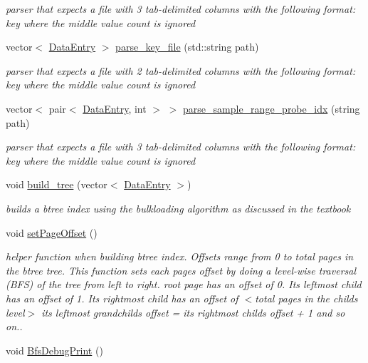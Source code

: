 \begin{DoxyCompactItemize}
\begin{DoxyCompactList}\small\item\em parser that expects a file with 3 tab-\/delimited columns with the following format\+: key where the middle value count is ignored \end{DoxyCompactList}\item 
vector$<$ \hyperlink{class_data_entry}{Data\+Entry} $>$ \hyperlink{class_b_tree_index_a42cb7169c0608f56cd34b9aa7eb91fb8}{parse\+\_\+key\+\_\+file} (std\+::string path)
\begin{DoxyCompactList}\small\item\em parser that expects a file with 2 tab-\/delimited columns with the following format\+: key where the middle value count is ignored \end{DoxyCompactList}\item 
\hypertarget{class_b_tree_index_ad9fa5f28875c96e7d10f06f3d2a6771f}{}vector$<$ pair$<$ \hyperlink{class_data_entry}{Data\+Entry}, int $>$ $>$ \hyperlink{class_b_tree_index_ad9fa5f28875c96e7d10f06f3d2a6771f}{parse\+\_\+sample\+\_\+range\+\_\+probe\+\_\+idx} (string path)\label{class_b_tree_index_ad9fa5f28875c96e7d10f06f3d2a6771f}

\begin{DoxyCompactList}\small\item\em parser that expects a file with 3 tab-\/delimited columns with the following format\+: key where the middle value count is ignored \end{DoxyCompactList}\item 
void \hyperlink{class_b_tree_index_a4517e016a4f60cd2e61471f6ba10f347}{build\+\_\+tree} (vector$<$ \hyperlink{class_data_entry}{Data\+Entry} $>$)
\begin{DoxyCompactList}\small\item\em builds a btree index using the bulkloading algorithm as discussed in the textbook \end{DoxyCompactList}\item 
\hypertarget{class_b_tree_index_a46927719822348be775e2ce581a06de0}{}void \hyperlink{class_b_tree_index_a46927719822348be775e2ce581a06de0}{set\+Page\+Offset} ()\label{class_b_tree_index_a46927719822348be775e2ce581a06de0}

\begin{DoxyCompactList}\small\item\em helper function when building btree index. Offsets range from 0 to total pages in the btree tree. This function sets each page\textquotesingle{}s offset by doing a level-\/wise traversal (B\+F\+S) of the tree from left to right. root page has an offset of 0. Its leftmost child has an offset of 1. Its rightmost child has an offset of $<$total pages in the child\textquotesingle{}s level$>$ its leftmost grandchild\textquotesingle{}s offset = its rightmost child\textquotesingle{}s offset + 1 and so on.. \end{DoxyCompactList}\item 
\hypertarget{class_b_tree_index_af931d39bed7e041211aafd30c6972152}{}void \hyperlink{class_b_tree_index_af931d39bed7e041211aafd30c6972152}{Bfs\+Debug\+Print} ()\label{class_b_tree_index_af931d39bed7e041211aafd30c6972152}


\end{DoxyCompactItemize}
